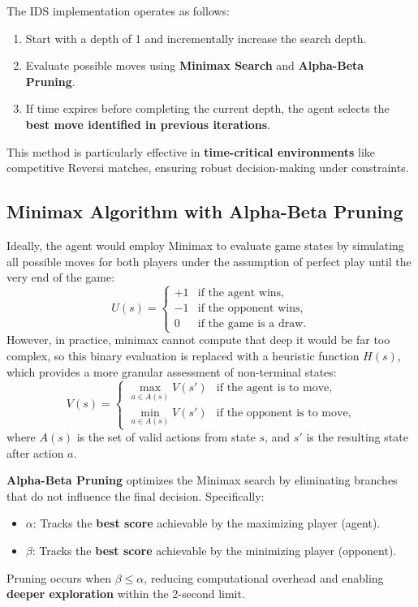 \documentclass[11pt]{article}
\begin{document}
\noindent The IDS implementation operates as follows:
\begin{enumerate}
    \item Start with a depth of 1 and incrementally increase the search depth.
    \item Evaluate possible moves using \textbf{Minimax Search} and \textbf{Alpha-Beta Pruning}.
    \item If time expires before completing the current depth, the agent selects the \textbf{best move identified in previous iterations}.
\end{enumerate}

This method is particularly effective in \textbf{time-critical environments} like competitive Reversi matches, ensuring robust decision-making under constraints.

\subsection*{Minimax Algorithm with Alpha-Beta Pruning}
\noindent Ideally, the agent would employ Minimax to evaluate game states by simulating all possible moves for both players under the assumption of perfect play until the very end of the game:
\[
U(s) = 
\begin{cases} 
+1 & \text{if the agent wins}, \\
-1 & \text{if the opponent wins}, \\
0 & \text{if the game is a draw}.
\end{cases}
\]
However, in practice, minimax cannot compute that deep it would be far too complex, so this binary evaluation is replaced with a heuristic function \(H(s)\), which provides a more granular assessment of non-terminal states:
\[
V(s) = 
\begin{cases} 
\max_{a \in A(s)} V(s') & \text{if the agent is to move}, \\
\min_{a \in A(s)} V(s') & \text{if the opponent is to move},
\end{cases}
\]
where \(A(s)\) is the set of valid actions from state \(s\), and \(s'\) is the resulting state after action \(a\).

\noindent \textbf{Alpha-Beta Pruning} optimizes the Minimax search by eliminating branches that do not influence the final decision\cite{alpha_beta}. Specifically:
\begin{itemize}
    \item \(\alpha\): Tracks the \textbf{best score} achievable by the maximizing player (agent).
    \item \(\beta\): Tracks the \textbf{best score} achievable by the minimizing player (opponent).
\end{itemize}
Pruning occurs when \(\beta \leq \alpha\), reducing computational overhead and enabling \textbf{deeper exploration} within the 2-second limit.
\end{document}
